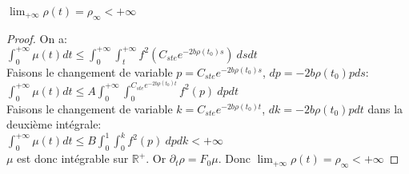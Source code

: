 \documentclass[11pt]{article}
\newcommand{\dt}{\partial_t}
\theoremstyle{definition}
\begin{document}
\begin{lemma}$\lim_{+\infty} \rho(t)= \rho_\infty < +\infty$  \end{lemma}
\begin{proof}On a:\\
$\int_0^{+\infty}\mu(t)dt \leq \int_0^{+\infty}\int_t^{+\infty}f^2(C_{ste}e^{-2b \rho(t_0)s})\ dsdt$\\
Faisons le changement de variable $p = C_{ste}e^{-2b \rho(t_0)s}$, $dp = -2b \rho(t_0)pds$:\\
$\int_0^{+\infty}\mu(t)dt \leq A\int_0^{+\infty}\int_0^{C_{ste}e^{-2b \rho(t_0)t}}f^2(p)\ dpdt$\\
Faisons le changement de variable $k = C_{ste}e^{-2b \rho(t_0)t}$, $dk = -2b \rho(t_0)pdt$ dans la deuxième intégrale:\\
$\int_0^{+\infty}\mu(t)dt \leq B\int_0^{1}\int_0^{k}f^2(p)\ dp dk < +\infty $\\
$\mu$ est donc intégrable sur $\mathbb{R}^+$. Or $ \dt\rho=  F_0 \mu$. Donc $\lim_{+\infty} \rho(t)= \rho_\infty < +\infty$ 
\end{proof}
\end{document}
